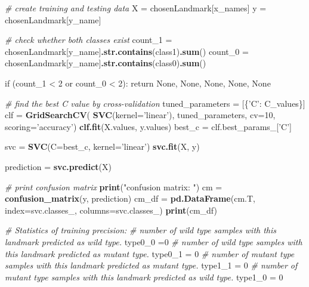 \documentclass[10pt,letterpaper]{article}
\newenvironment{Shaded}{\begin{snugshade}}{\end{snugshade}}
\newcommand{\KeywordTok}[1]{\textcolor[rgb]{0.13,0.29,0.53}{\textbf{{#1}}}}
\newcommand{\DataTypeTok}[1]{\textcolor[rgb]{0.13,0.29,0.53}{{#1}}}
\newcommand{\DecValTok}[1]{\textcolor[rgb]{0.00,0.00,0.81}{{#1}}}
\newcommand{\StringTok}[1]{\textcolor[rgb]{0.31,0.60,0.02}{{#1}}}
\newcommand{\CommentTok}[1]{\textcolor[rgb]{0.56,0.35,0.01}{\textit{{#1}}}}
\newcommand{\NormalTok}[1]{{#1}}
\begin{document}
\begin{Shaded}
\begin{Highlighting}[]
    \CommentTok{# create training and testing data}
    \NormalTok{X =}\StringTok{ }\NormalTok{chosenLandmark[x_names]}
    \NormalTok{y =}\StringTok{ }\NormalTok{chosenLandmark[y_name]}

    \CommentTok{# check whether both classes exist}
    \NormalTok{count_1 =}\StringTok{ }\NormalTok{chosenLandmark[y_name]}\KeywordTok{.str.contains}\NormalTok{(class1)}\KeywordTok{.sum}\NormalTok{()}
    \NormalTok{count_0 =}\StringTok{ }\NormalTok{chosenLandmark[y_name]}\KeywordTok{.str.contains}\NormalTok{(class0)}\KeywordTok{.sum}\NormalTok{()}

    \NormalTok{if (count_1 <}\StringTok{ }\DecValTok{2} \NormalTok{or count_0 <}\StringTok{ }\DecValTok{2}\NormalTok{):}
\StringTok{        }\NormalTok{return None, None, None, None, None}

    \CommentTok{# find the best C value by cross-validation}
    \NormalTok{tuned_parameters =}\StringTok{ }\NormalTok{[\{}\StringTok{'C'}\NormalTok{:}\StringTok{ }\NormalTok{C_values\}]}
    \NormalTok{clf =}\StringTok{ }\KeywordTok{GridSearchCV}\NormalTok{(}
        \KeywordTok{SVC}\NormalTok{(}\DataTypeTok{kernel=}\StringTok{'linear'}\NormalTok{), tuned_parameters, }\DataTypeTok{cv=}\DecValTok{10}\NormalTok{, }\DataTypeTok{scoring=}\StringTok{'accuracy'}\NormalTok{)}
    \KeywordTok{clf.fit}\NormalTok{(X.values, y.values)}
    \NormalTok{best_c =}\StringTok{ }\NormalTok{clf.best_params_[}\StringTok{'C'}\NormalTok{]}
    
    \NormalTok{svc =}\StringTok{ }\KeywordTok{SVC}\NormalTok{(}\DataTypeTok{C=}\NormalTok{best_c, }\DataTypeTok{kernel=}\StringTok{'linear'}\NormalTok{)}
    \KeywordTok{svc.fit}\NormalTok{(X, y)}
    
    \NormalTok{prediction =}\StringTok{ }\KeywordTok{svc.predict}\NormalTok{(X)}

    \CommentTok{# print confusion matrix}
    \KeywordTok{print}\NormalTok{(}\StringTok{"confusion matrix: "}\NormalTok{)}
    \NormalTok{cm =}\StringTok{ }\KeywordTok{confusion_matrix}\NormalTok{(y, prediction)}
    \NormalTok{cm_df =}\StringTok{ }\KeywordTok{pd.DataFrame}\NormalTok{(cm.T, }\DataTypeTok{index=}\NormalTok{svc.classes_, }\DataTypeTok{columns=}\NormalTok{svc.classes_)}
    \KeywordTok{print}\NormalTok{(cm_df)}

    \CommentTok{# Statistics of training precision:}
    \CommentTok{# number of wild type samples with this landmark predicted as wild type.}
    \NormalTok{type0_0 =}\DecValTok{0}
    \CommentTok{# number of wild type samples with this landmark predicted as mutant type.}
    \NormalTok{type0_1 =}\StringTok{ }\DecValTok{0}
    \CommentTok{# number of mutant type samples with this landmark predicted as mutant type.}
    \NormalTok{type1_1 =}\StringTok{ }\DecValTok{0}
    \CommentTok{# number of mutant type samples with this landmark predicted as wild type.}
    \NormalTok{type1_0 =}\StringTok{ }\DecValTok{0}
    

\end{Highlighting}
\end{Shaded}
\end{document}
